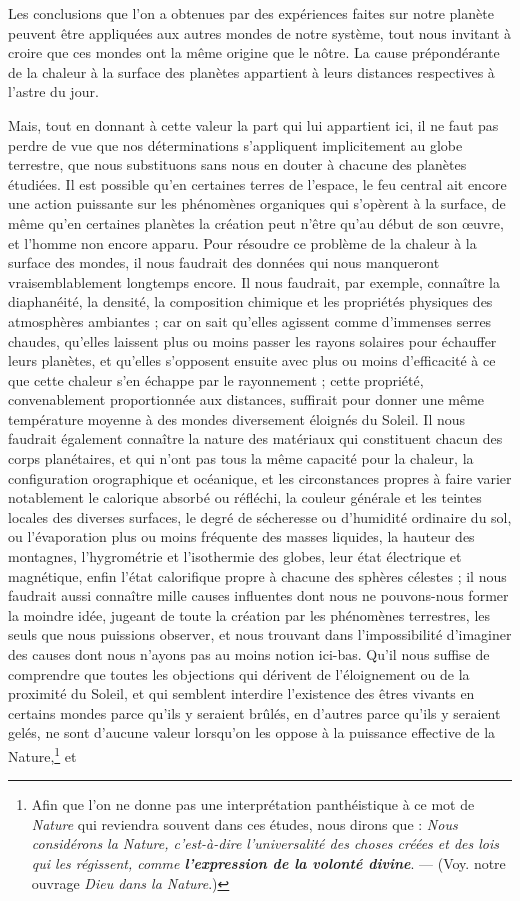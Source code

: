 \documentclass[a4paper, 11pt, oneside, landscape]{article}
\begin{document}
Les conclusions que l'on a obtenues par des expériences faites sur notre planète peuvent être appliquées aux autres mondes de notre système, tout nous invitant à croire que ces mondes ont la même origine que le nôtre. La cause prépondérante de la chaleur à la surface des planètes appartient à leurs distances respectives à l'astre du jour.

Mais, tout en donnant à cette valeur la part qui lui appartient ici, il ne faut pas perdre de vue que nos déterminations s'appliquent implicitement au globe terrestre, que nous substituons sans nous en douter à chacune des planètes étudiées. Il est possible qu'en certaines terres de l'espace, le feu central ait encore une action puissante sur les phénomènes organiques qui s'opèrent à la surface, de même qu'en certaines planètes la création peut n'être qu'au début de son œuvre, et l'homme non encore apparu. Pour résoudre ce problème de la chaleur à la surface des mondes, il nous faudrait des données qui nous manqueront vraisemblablement longtemps encore. Il nous faudrait, par exemple, connaître la diaphanéité, la densité, la composition chimique et les propriétés physiques des atmosphères ambiantes ; car on sait qu'elles agissent comme d'immenses serres chaudes, qu'elles laissent plus ou moins passer les rayons solaires pour échauffer leurs planètes, et qu'elles s'opposent ensuite avec plus ou moins d'efficacité à ce que cette chaleur s'en échappe par le rayonnement ; cette propriété, convenablement proportionnée aux distances, suffirait pour donner une même température moyenne à des mondes diversement éloignés du Soleil. Il nous faudrait également connaître la nature des matériaux qui constituent chacun des corps planétaires, et qui n'ont pas tous la même capacité pour la chaleur, la configuration orographique et océanique, et les circonstances propres à faire varier notablement le calorique absorbé ou réfléchi, la couleur générale et les teintes locales des diverses surfaces, le degré de sécheresse ou d'humidité ordinaire du sol, ou l'évaporation plus ou moins fréquente des masses liquides, la hauteur des montagnes, l'hygrométrie et l'isothermie des globes, leur état électrique et magnétique, enfin l'état calorifique propre à chacune des sphères célestes ; il nous faudrait aussi connaître mille causes influentes dont nous ne pouvons-nous former la moindre idée, jugeant de toute la création par les phénomènes terrestres, les seuls que nous puissions observer, et nous trouvant dans l'impossibilité d'imaginer des causes dont nous n'ayons pas au moins notion ici-bas. Qu'il nous suffise de comprendre que toutes les objections qui dérivent de l'éloignement ou de la proximité du Soleil, et qui semblent interdire l'existence des êtres vivants en certains mondes parce qu'ils y seraient brûlés, en d'autres parce qu'ils y seraient gelés, ne sont d'aucune valeur lorsqu'on les oppose à la puissance effective de la Nature,\footnote{Afin que l'on ne donne pas une interprétation panthéistique à ce mot de \emph{Nature} qui reviendra souvent dans ces études, nous dirons que : \emph{Nous considérons la Nature, c'est-à-dire l'universalité des choses créées et des lois qui les régissent, comme \textbf{l'expression de la volonté divine}}. --- (Voy. notre ouvrage \emph{Dieu dans la Nature}.)} et 
\end{document}
